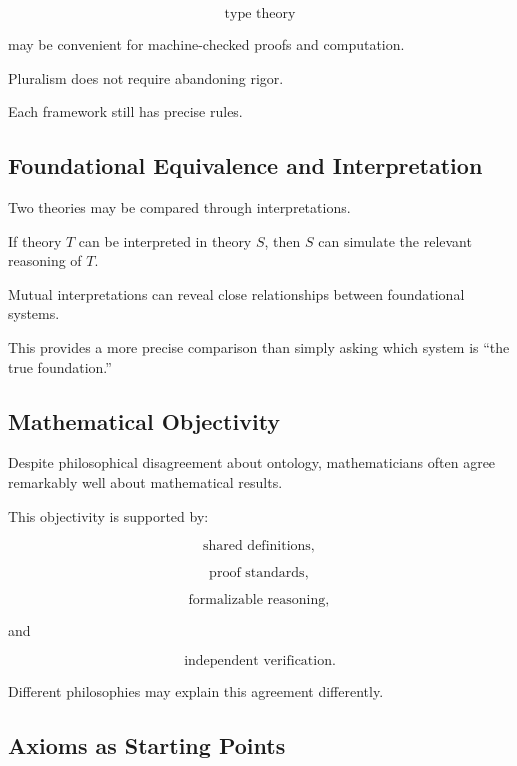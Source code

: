 \[
\boxed{
\text{type theory}
}
\]

may be convenient for machine-checked proofs and computation.

Pluralism does not require abandoning rigor.

Each framework still has precise rules.

\subsection{Foundational Equivalence and Interpretation}
\label{subsec:foundational-interpretation}

Two theories may be compared through interpretations.

If theory \(T\) can be interpreted in theory \(S\), then \(S\) can simulate
the relevant reasoning of \(T\).

Mutual interpretations can reveal close relationships between foundational
systems.

This provides a more precise comparison than simply asking which system is
``the true foundation.''

\subsection{Mathematical Objectivity}
\label{subsec:mathematical-objectivity}

Despite philosophical disagreement about ontology, mathematicians often
agree remarkably well about mathematical results.

This objectivity is supported by:

\[
\boxed{
\text{shared definitions},
}
\]

\[
\boxed{
\text{proof standards},
}
\]

\[
\boxed{
\text{formalizable reasoning},
}
\]

and

\[
\boxed{
\text{independent verification}.
}
\]

Different philosophies may explain this agreement differently.

\subsection{Axioms as Starting Points}
\label{subsec:axioms-as-starting-points}

